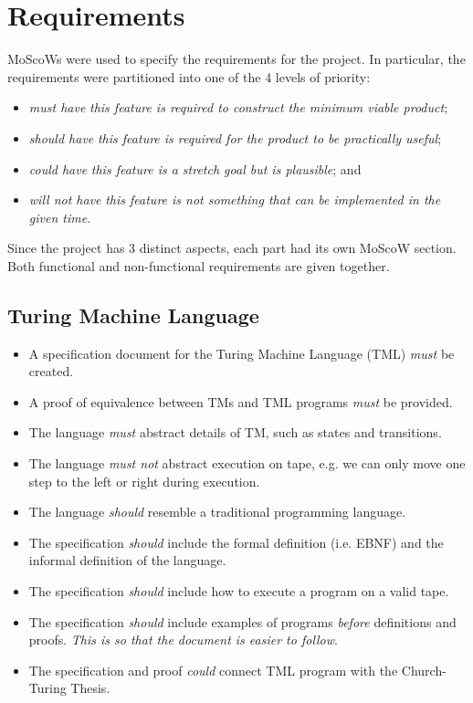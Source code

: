 \chapter{Requirements}

MoScoWs were used to specify the requirements for the project. In particular, the requirements were partitioned into one of the 4 levels of priority:
\begin{itemize}
    \item \emph{must have} \textit{this feature is required to construct the minimum viable product}; 
    \item \emph{should have} \textit{this feature is required for the product to be practically useful};
    \item \emph{could have} \textit{this feature is a stretch goal but is plausible}; and
    \item \emph{will not have} \textit{this feature is not something that can be implemented in the given time}.
\end{itemize} 
Since the project has 3 distinct aspects, each part had its own MoScoW section. Both functional and non-functional requirements are given together.

\section{Turing Machine Language}
\begin{itemize}
    \item A specification document for the Turing Machine Language (TML) \emph{must} be created.
    \item A proof of equivalence between TMs and TML programs \emph{must} be provided. 
    \item The language \emph{must} abstract details of TM, such as states and transitions.
    \item The language \emph{must not} abstract execution on tape, e.g. we can only move one step to the left or right during execution.
    \item The language \emph{should} resemble a traditional programming language.
    \item The specification \emph{should} include the formal definition (i.e. EBNF) and the informal definition of the language.
    \item The specification \emph{should} include how to execute a program on a valid tape.
    \item The specification \emph{should} include examples of programs \textit{before} definitions and proofs. \textit{This is so that the document is easier to follow}.
    \item The specification and proof \emph{could} connect TML program with the Church-Turing Thesis. 
\end{itemize}

